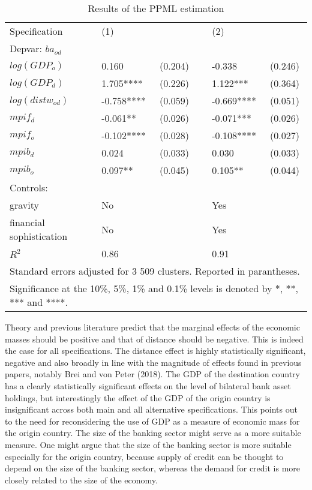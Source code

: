 \documentclass[12pt,a4paper]{article}
\begin{document}
\begin{table}[!h]
\centering
\begin{tabular}{ l l l l l l}
\hline
Specification&(1)&&&(2)& \\
Depvar: $ba_{od}$&&&&&\\
\hline
$log(GDP_{o})$&0.160&(0.204)&&-0.338&(0.246)\\
$log(GDP_{d})$&1.705****&(0.226)&&1.122***&(0.364)\\
$log(distw_{od})$&-0.758****&(0.059)&&-0.669****&(0.051)\\
$mpif_{d}$&-0.061**&(0.026)&&-0.071***&(0.026)\\
$mpif_{o}$&-0.102****&(0.028)&&-0.108****&(0.027)\\
$mpib_{d}$&0.024&(0.033)&&0.030&(0.033)\\
$mpib_{o}$&0.097**&(0.045)&&0.105**&(0.044)\\
Controls:&&&&&\\
gravity &No&&&Yes& \\ 
financial sophistication &No&&&Yes& \\
\hline
$R^2$&0.86&&&0.91&\\
\hline
\multicolumn{6}{l}{Standard errors adjusted for 3 509 clusters. Reported in parantheses. }\\
\hline
\multicolumn{6}{l}{\footnotesize Significance at the 10\%, 5\%, 1\% and 0.1\% levels is denoted by *, **, *** and ****.}\\
\end{tabular}
\caption{Results of the PPML estimation}
\label{tab:results}
\end{table}

Theory and previous literature predict that the marginal effects of the economic masses should be positive and that of distance should be negative. This is indeed the case for all specifications. The distance effect is highly statistically significant, negative and also broadly in line with the magnitude of effects found in previous papers, notably Brei and von Peter (2018). The GDP of the destination country has a clearly statistically significant effects on the level of bilateral bank asset holdings, but interestingly the effect of the GDP of the origin country is insignificant across both main and all alternative specifications. This points out to the need for reconsidering the use of GDP as a measure of economic mass for the origin country. The size of the banking sector might serve as a more suitable measure. One might argue that the size of the banking sector is more suitable especially for the origin country, because supply of credit can be thought to depend on the size of the banking sector, whereas the demand for credit is more closely related to the size of the economy. 
\end{document}
